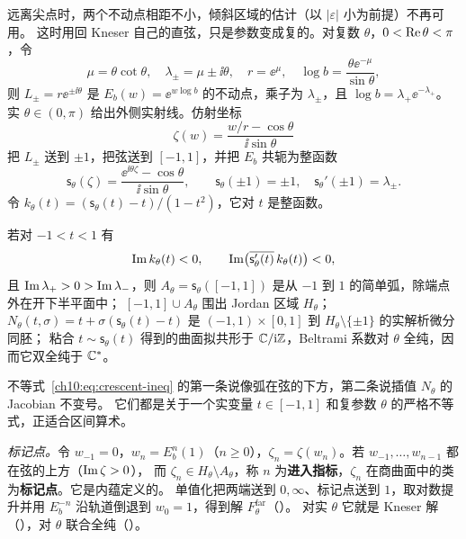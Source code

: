 远离尖点时，两个不动点相距不小，倾斜区域的估计（以 $|\varepsilon|$ 小为前提）不再可用。
这时用回 Kneser 自己的直弦，只是参数变成复的。对复数 $\theta$，$0<\operatorname{Re}\theta<\pi$，令
\[
  \mu=\theta\cot\theta,\quad \lambda_\pm=\mu\pm\ii\theta,\quad r=\ee^{\mu},\quad
  \log b=\frac{\theta\ee^{-\mu}}{\sin\theta},
\]
则 $L_\pm=r\ee^{\pm\ii\theta}$ 是 $E_b(w)=\ee^{w\log b}$ 的不动点，乘子为 $\lambda_\pm$，且 $\log b=\lambda_+\ee^{-\lambda_+}$。
实 $\theta\in(0,\pi)$ 给出外侧实射线。仿射坐标
\[
  \zeta(w)=\frac{w/r-\cos\theta}{\ii\sin\theta}
\]
把 $L_\pm$ 送到 $\pm1$，把弦送到 $[-1,1]$，并把 $E_b$ 共轭为整函数
\begin{equation}\label{ch10:eq:seam-map}
  \mathsf s_\theta(\zeta)=\frac{\ee^{\ii\theta\zeta}-\cos\theta}{\ii\sin\theta},\qquad \mathsf s_\theta(\pm1)=\pm1,\quad \mathsf s_\theta'(\pm1)=\lambda_\pm .
\end{equation}
令 $k_\theta(t)=(\mathsf s_\theta(t)-t)/(1-t^2)$，它对 $t$ 是整函数。

\begin{lemma}\label{ch10:lem:crescent}
若对 $-1<t<1$ 有
\begin{equation}\label{ch10:eq:crescent-ineq}
  \operatorname{Im} k_\theta(t)<0,\qquad \operatorname{Im}\bigl(\overline{\mathsf s_\theta'(t)}\,k_\theta(t)\bigr)<0,
\end{equation}
且 $\operatorname{Im}\lambda_+>0>\operatorname{Im}\lambda_-$，则 $A_\theta=\mathsf s_\theta([-1,1])$ 是从 $-1$ 到 $1$ 的简单弧，除端点外在开下半平面中；
$[-1,1]\cup A_\theta$ 围出 Jordan 区域 $H_\theta$；$N_\theta(t,\sigma)=t+\sigma(\mathsf s_\theta(t)-t)$ 是 $(-1,1)\times[0,1]$ 到 $H_\theta\setminus\{\pm1\}$ 的实解析微分同胚；
粘合 $t\sim\mathsf s_\theta(t)$ 得到的曲面拟共形于 $\mathbb{C}/\mathrm{i}\mathbb{Z}$，Beltrami 系数对 $\theta$ 全纯，因而它双全纯于 $\mathbb{C}^*$。
\end{lemma}

不等式~\eqref{ch10:eq:crescent-ineq} 的第一条说像弧在弦的下方，第二条说插值 $N_\theta$ 的 Jacobian 不变号。
它们都是关于一个实变量 $t\in[-1,1]$ 和复参数 $\theta$ 的严格不等式，正适合区间算术。

\emph{标记点。}令 $w_{-1}=0$，$w_n=E_b^n(1)$（$n\ge0$），$\zeta_n=\zeta(w_n)$。若 $w_{-1},\dots,w_{n-1}$ 都在弦的上方（$\operatorname{Im}\zeta>0$），
而 $\zeta_n\in H_\theta\setminus A_\theta$，称 $n$ 为\textbf{进入指标}，$\zeta_n$ 在商曲面中的类为\textbf{标记点}。它是内蕴定义的。
单值化把两端送到 $0,\infty$、标记点送到 $1$，取对数提升并用 $E_b^{-n}$ 沿轨道倒退到 $w_0=1$，得到解 $F^{\mathrm{far}}_\theta$（\cite[定义~10.30]{KneserPaper}）。
对实 $\theta$ 它就是 Kneser 解（\cite[命题~10.32]{KneserPaper}），对 $\theta$ 联合全纯（\cite[命题~10.31]{KneserPaper}）。


